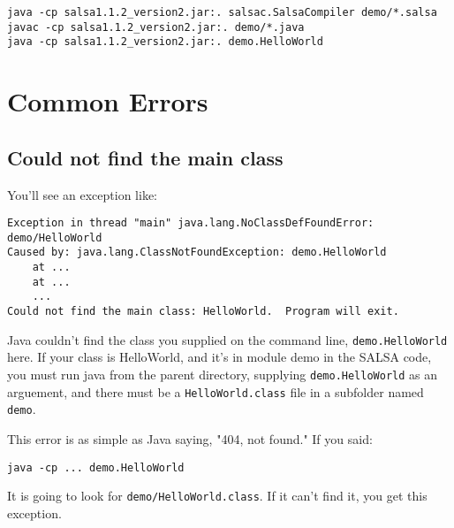 \documentclass{article}
\begin{document}
\begin{lstlisting}
java -cp salsa1.1.2_version2.jar:. salsac.SalsaCompiler demo/*.salsa
javac -cp salsa1.1.2_version2.jar:. demo/*.java
java -cp salsa1.1.2_version2.jar:. demo.HelloWorld
\end{lstlisting}

\section{Common Errors}
\subsection{Could not find the main class}
You'll see an exception like:
\begin{lstlisting}
Exception in thread "main" java.lang.NoClassDefFoundError: demo/HelloWorld
Caused by: java.lang.ClassNotFoundException: demo.HelloWorld
	at ...
	at ...
	...
Could not find the main class: HelloWorld.  Program will exit.
\end{lstlisting}

Java couldn't find the class you supplied on the command line,
\texttt{demo.HelloWorld} here. If your class is HelloWorld, and it's in module
demo in the SALSA code, you must run java from the parent directory, supplying
\texttt{demo.HelloWorld} as an arguement, and there must be a
\texttt{HelloWorld.class} file in a subfolder named \texttt{demo}.

This error is as simple as Java saying, "404, not found." If you said:

\texttt{java -cp ... demo.HelloWorld}

It is going to look for \texttt{demo/HelloWorld.class}. If it can't find it,
you get this exception.
\end{document}
